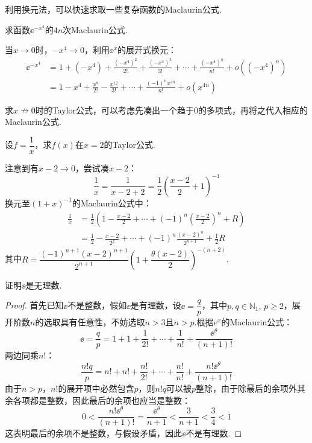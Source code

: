 利用换元法，可以快速求取一些复杂函数的Maclaurin公式.

\begin{question}
    求函数$\ee^{-x^4}$的$4n$次Maclaurin公式.
\end{question}

\begin{solution}
    当$x \to 0$时，$-x^4 \to 0$，利用$\ee^x$的展开式换元：
    \begin{align*}
        \ee^{-x^4} &= 1 + (-x^4) + \frac{(-x^4)^2}{2!} + \frac{(-x^4)^3}{3!} + \cdots + \frac{(-x^4)^n}{n!} + o((-x^4)^n) \\
        &= 1 - x^4 + \frac{x^8}{2!} - \frac{x^{12}}{3!} + \cdots + \frac{(-1)^n x^{4n}}{n!} + o(x^{4n})
    \end{align*}
\end{solution}

求$x \nrightarrow 0$时的Taylor公式，可以考虑先凑出一个趋于$0$的多项式，再将之代入相应的Maclaurin公式.

\begin{question}
    设$f = \dfrac{1}{x}$，求$f(x)$在$x=2$的Taylor公式.
\end{question}

\begin{solution}
    注意到有$x-2 \to 0$，尝试凑$x-2$：
    \[\frac{1}{x} = \frac{1}{x-2+2} = \frac{1}{2}\left(\frac{x-2}{2} + 1\right)^{-1}\]
    换元至$(1+x)^{-1}$的Maclaurin公式中：
    \begin{align*}
    \frac{1}{x} &= \frac{1}{2}\left(1 - \frac{x-2}{2} + \cdots + (-1)^n\left(\frac{x-2}{2}\right)^n + R\right) \\
    &= \frac{1}{2} - \frac{x-2}{2^2} + \cdots + (-1)^n \frac{(x-2)^n}{2^{n+1}} + \frac{1}{2}R
    \end{align*}
    其中$R = \dfrac{(-1)^{n+1}(x-2)^{n+1}}{2^{n+1}}\left(1+\dfrac{\theta(x-2)}{2}\right)^{-(n+2)}$.
\end{solution}

\begin{question}
    证明$\ee$是无理数.
\end{question}

\begin{proof}
    首先已知$\ee$不是整数，假如$\ee$是有理数，设$\ee = \dfrac{q}{p}$，其中$p,q \in \mathbb{N}_1,\,p\geqslant 2$，展开阶数$n$的选取具有任意性，不妨选取$n>3$且$n>p$.根据$e^x$的Maclaurin公式：
    \[\ee =\frac{q}{p} = 1 + 1 + \frac{1}{2!} + \cdots + \frac{1}{n!} + \frac{\ee^\theta}{(n+1)!}\]
    两边同乘$n!$：
    \[\frac{n!q}{p} = n! + n! + \frac{n!}{2!} + \cdots + \frac{n!}{n!} + \frac{n!\ee^\theta}{(n+1)!}\]
    由于$n>p$，$n!$的展开项中必然包含$p$，则$n!q$可以被$p$整除，由于除最后的余项外其余各项都是整数，因此最后的余项也应当是整数：
    \[0 < \frac{n!\ee^\theta}{(n+1)!} = \frac{\ee^\theta}{n+1} < \frac{3}{n+1} < \frac{3}{4} < 1\]
    这表明最后的余项不是整数，与假设矛盾，因此$\ee$不是有理数.
\end{proof}

